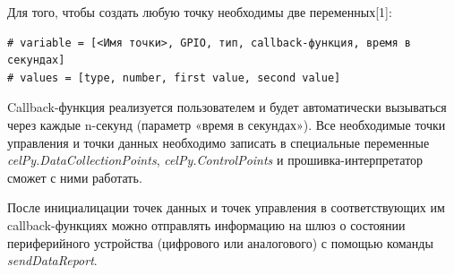 \documentclass[11pt]{article}
\begin{document}
Для того, чтобы создать любую точку необходимы две переменных[1]:

\begin{verbatim}
# variable = [<Имя точки>, GPIO, тип, callback-функция, время в секундах]
# values = [type, number, first value, second value]
\end{verbatim}

Callback-функция реализуется пользователем и будет автоматически вызываться через каждые
n-секунд (параметр «время в секундах»). Все необходимые точки управления и точки данных
необходимо записать в специальные переменные \emph{celPy.DataCollectionPoints},
\emph{celPy.ControlPoints} и прошивка-интерпретатор сможет с ними работать.

После инициалицации точек данных и точек управления в соответствующих им 
callback-функциях можно отправлять информацию на шлюз  о состоянии периферийного 
устройства (цифрового или аналогового) с помощью команды \emph{sendDataReport}.
\end{document}
